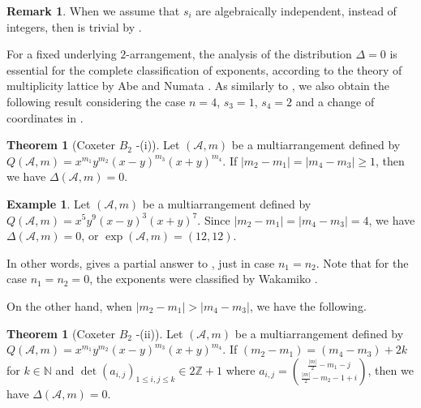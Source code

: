 \documentclass[12pt]{amsart}
\theoremstyle{definition}
\newtheorem{theorem}[definition]{Theorem}
\newtheorem{remark}[definition]{Remark}
\newtheorem{example}[definition]{Example}
\newcommand{\NN}{\mathbb{N}}
\newcommand{\ZZ}{\mathbb{Z}}
\newcommand{\AAA}{\mathcal{A}}
\newcommand{\red}[1]{\textcolor{red}{#1}}
\begin{document}
\begin{remark}
When we assume that $s_i$ are algebraically independent, instead of integers, 
then  is trivial by . 
\end{remark}
%
For a fixed underlying $2$-arrangement, 
the analysis of the distribution %
$\Delta=0$ is essential for the complete classification of exponents, 
according to the theory of multiplicity lattice 
by Abe and Numata \cite{Abe-Numata}. 
As similarly to %
, 
we also obtain the following result %
considering the case $n=4$, $s_3=1$, $s_4=2$ 
and a change of coordinates in . 
\begin{theorem}[Coxeter $B_2$ -(i)]
\label{corollary:main theorem}
Let $(\AAA,m)$ be a multiarrangement defined by $Q(\AAA,m)=x^{m_1}y^{m_2}(x-y)^{m_3}(x+y)^{m_4}$. 
If $|{m_2}-{m_1}|=|{m_4}-{m_3}|\geq 1$, then 
we have $\Delta(\AAA,m)=0$. %
\end{theorem}
%
\begin{example}
    \label{example:corollary to B2}
Let  $(\AAA,m)$ be a multiarrangement defined by 
$Q(\AAA,m)=x^{5}y^{9}(x-y)^{3}(x+y)^{7}$. 
Since $|m_2-m_1|=|m_4-m_3|=4$, 
we have $\Delta(\AAA,m)=0$, or $\exp(\AAA,m)=(12,12)$.
\end{example}
%
In other words,  %
gives a partial answer to , 
just in case $n_1=n_2$. %
Note that for the case $n_1=n_2=0$, 
the exponents were classified by Wakamiko \cite{Wakamiko:universal}. 

On the other hand, 
when $|m_2-m_1|>|m_4-m_3|$, 
we have the following. 
\begin{theorem}[Coxeter $B_2$ -(ii)]
\label{theorem:B2exponents_new}
Let $(\AAA,m)$ be a multiarrangement defined by 
$Q(\AAA,m)=x^{m_1}y^{m_2}(x-y)^{m_3}(x+y)^{m_4}$. 
If $({m_2}-{m_1})=({m_4}-{m_3})+2k$ for $k\in\NN$ 
and 
$\det (a_{i,j})_{1\leq i,j\leq k}\in2\ZZ+1$  where 
$a_{i,j}=\binom{\frac{|m|}{2}-m_1-j}{\frac{|m|}{2}-m_2-1+i}$, 
then we have $\Delta(\AAA,m)=0$. 
\end{theorem}
\end{document}
